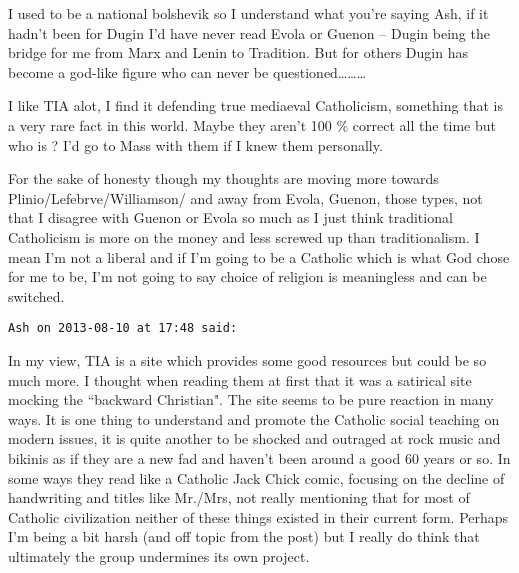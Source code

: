 \begin{footnotesize}
\begin{sffamily}
I used to be a national bolshevik so I understand what you're saying Ash, if it hadn't been for Dugin I'd have never read Evola or Guenon – Dugin being the bridge for me from Marx and Lenin to Tradition. But for others Dugin has become a god-like figure who can never be questioned………

I like TIA alot, I find it defending true mediaeval Catholicism, something that is a very rare fact in this world. Maybe they aren't 100 \% correct all the time but who is ? I'd go to Mass with them if I knew them personally.

For the sake of honesty though my thoughts are moving more towards Plinio/Lefebrve/Williamson/ and away from Evola, Guenon, those types, not that I disagree with Guenon or Evola so much as I just think traditional Catholicism is more on the money and less screwed up than traditionalism. I mean I'm not a liberal and if I'm going to be a Catholic which is what God chose for me to be, I'm not going to say choice of religion is meaningless and can be switched.


\hfill

\texttt{Ash on 2013-08-10 at 17:48 said: }

In my view, TIA is a site which provides some good resources but could be so much more. I thought when reading them at first that it was a satirical site mocking the ``backward Christian". The site seems to be pure reaction in many ways. It is one thing to understand and promote the Catholic social teaching on modern issues, it is quite another to be shocked and outraged at rock music and bikinis as if they are a new fad and haven't been around a good 60 years or so. In some ways they read like a Catholic Jack Chick comic, focusing on the decline of handwriting and titles like Mr./Mrs, not really mentioning that for most of Catholic civilization neither of these things existed in their current form. Perhaps I'm being a bit harsh (and off topic from the post) but I really do think that ultimately the group undermines its own project. 


\end{sffamily}
\end{footnotesize}

